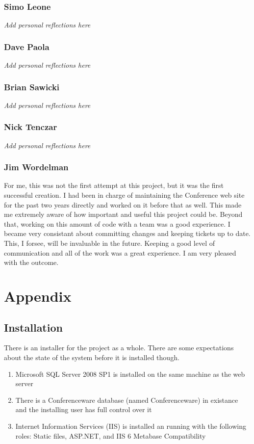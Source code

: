 \documentclass[12pt]{article}
\begin{document}
\subsubsection{Simo Leone}
\textit{Add personal reflections here}
\subsubsection{Dave Paola}
\textit{Add personal reflections here}
\subsubsection{Brian Sawicki}
\textit{Add personal reflections here}
\subsubsection{Nick Tenczar}
\textit{Add personal reflections here}
\subsubsection{Jim Wordelman}
For me, this was not the first attempt at this project, but it was the first
successful creation. I had been in charge of maintaining the Conference web site
for the past two years directly and worked on it before that as well. This made
me extremely aware of how important and useful this project could be. Beyond
that, working on this amount of code with a team was a good experience. I became
very consistant about committing changes and keeping tickets up to date. This, I
forsee, will be invaluable in the future. Keeping a good level of communication
and all of the work was a great experience. I am very pleased with the outcome.
\newpage
\section{Appendix}
\subsection{Installation}
There is an installer for the project as a whole. There are some expectations
about the state of the system before it is installed though.
\begin{enumerate}
\item Microsoft SQL Server 2008 SP1 is installed on the same machine as the web
server
\item There is a Conferenceware database (named Conferenceware) in existance and
the installing user has full control over it
\item Internet Information Services (IIS) is installed an running with the
following roles: Static files, ASP.NET, and IIS 6 Metabase Compatibility
\end{enumerate}
\end{document}
